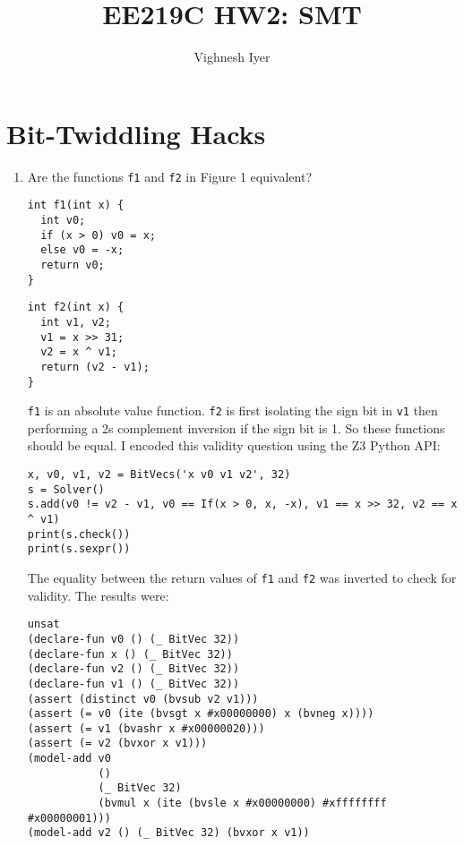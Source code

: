 

\title{EE219C HW2: SMT}
\author{Vighnesh Iyer}
\date{}
\maketitle

\section{Bit-Twiddling Hacks}
\begin{enumerate}[label=(\alph*)]
  \item {\color{blue}Are the functions \texttt{f1} and \texttt{f2} in Figure 1 equivalent?}

    \bigskip
    \noindent
    \begin{minipage}[c]{0.4\textwidth}
      \begin{verbatim}
int f1(int x) {
  int v0;
  if (x > 0) v0 = x;
  else v0 = -x;
  return v0;
}
      \end{verbatim}
    \end{minipage}
    \hfill
    \begin{minipage}[c]{0.4\textwidth}
      \begin{verbatim}
int f2(int x) {
  int v1, v2;
  v1 = x >> 31;
  v2 = x ^ v1;
  return (v2 - v1);
}
      \end{verbatim}
    \end{minipage}
    \bigskip

    \texttt{f1} is an absolute value function. \texttt{f2} is first isolating the sign bit in \texttt{v1} then performing a 2s complement inversion if the sign bit is 1. So these functions should be equal. I encoded this validity question using the Z3 Python API:

    \begin{verbatim}
x, v0, v1, v2 = BitVecs('x v0 v1 v2', 32)
s = Solver()
s.add(v0 != v2 - v1, v0 == If(x > 0, x, -x), v1 == x >> 32, v2 == x ^ v1)
print(s.check())
print(s.sexpr())
    \end{verbatim}

    The equality between the return values of \texttt{f1} and \texttt{f2} was inverted to check for validity. The results were:
    \begin{verbatim}
unsat
(declare-fun v0 () (_ BitVec 32))
(declare-fun x () (_ BitVec 32))
(declare-fun v2 () (_ BitVec 32))
(declare-fun v1 () (_ BitVec 32))
(assert (distinct v0 (bvsub v2 v1)))
(assert (= v0 (ite (bvsgt x #x00000000) x (bvneg x))))
(assert (= v1 (bvashr x #x00000020)))
(assert (= v2 (bvxor x v1)))
(model-add v0
           ()
           (_ BitVec 32)
           (bvmul x (ite (bvsle x #x00000000) #xffffffff #x00000001)))
(model-add v2 () (_ BitVec 32) (bvxor x v1))
    \end{verbatim}


\end{enumerate}
